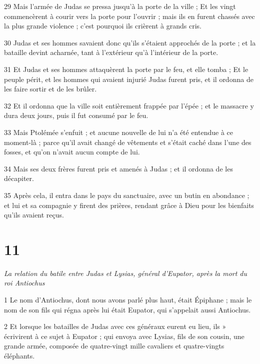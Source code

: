 \par 29 Mais l'armée de Judas se pressa jusqu'à la porte de la ville ; Et les vingt commencèrent à courir vers la porte pour l'ouvrir ; mais ils en furent chassés avec la plus grande violence ; c'est pourquoi ils crièrent à grands cris.

\par 30 Judas et ses hommes savaient donc qu'ils s'étaient approchés de la porte ; et la bataille devint acharnée, tant à l'extérieur qu'à l'intérieur de la porte.

\par 31 Et Judas et ses hommes attaquèrent la porte par le feu, et elle tomba ; Et le peuple périt, et les hommes qui avaient injurié Judas furent pris, et il ordonna de les faire sortir et de les brûler.

\par 32 Et il ordonna que la ville soit entièrement frappée par l'épée ; et le massacre y dura deux jours, puis il fut consumé par le feu.

\par 33 Mais Ptolémée s'enfuit ; et aucune nouvelle de lui n'a été entendue à ce moment-là ; parce qu'il avait changé de vêtements et s'était caché dans l'une des fosses, et qu'on n'avait aucun compte de lui.

\par 34 Mais ses deux frères furent pris et amenés à Judas ; et il ordonna de les décapiter.

\par 35 Après cela, il entra dans le pays du sanctuaire, avec un butin en abondance ; et lui et sa compagnie y firent des prières, rendant grâce à Dieu pour les bienfaits qu'ils avaient reçus.


\chapter{11}

\par \textit{La relation du batile entre Judas et Lysias, général d'Eupator, après la mort du roi Antiochus}

\par 1 Le nom d'Antiochus, dont nous avons parlé plus haut, était Épiphane ; mais le nom de son fils qui régna après lui était Eupator, qui s'appelait aussi Antiochus.

\par 2 Et lorsque les batailles de Judas avec ces généraux eurent eu lieu, ils » écrivirent à ce sujet à Eupator ; qui envoya avec Lysias, fils de son cousin, une grande armée, composée de quatre-vingt mille cavaliers et quatre-vingts éléphants.

